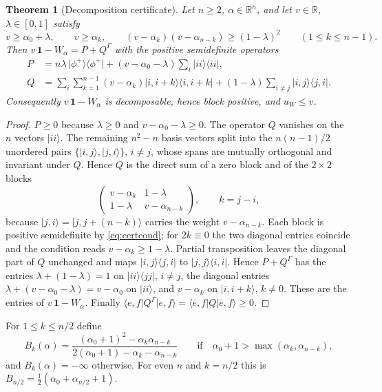 \documentclass[11pt,a4paper]{article}
\newtheorem{theorem}{Theorem}
\theoremstyle{remark}
\newcommand{\ket}[1]{\lvert #1\rangle}
\newcommand{\bra}[1]{\langle #1\rvert}
\newcommand{\ketbra}[2]{\lvert #1\rangle\langle #2\rvert}
\newcommand{\id}{\mathbf{1}}
\newcommand{\G}{\Gamma}
\newcommand{\uW}{u_W}
\begin{document}
\begin{theorem}[Decomposition certificate]\label{thm:cert}
Let $n\ge2$, $\alpha\in\mathbb{R}^n$, and let $v\in\mathbb{R}$, $\lambda\in[0,1]$ satisfy
\begin{equation}\label{eq:certcond}
v\ge\alpha_0+\lambda,\qquad v\ge\alpha_k,\qquad
(v-\alpha_k)(v-\alpha_{n-k})\ge(1-\lambda)^{2}\qquad(1\le k\le n-1).
\end{equation}
Then $v\,\id-W_\alpha=P+Q^{\G}$ with the positive semidefinite operators
\begin{align}
P&=n\lambda\,\ketbra{\phi^+}{\phi^+}+(v-\alpha_0-\lambda)\sum_i\ketbra{ii}{ii},\label{eq:P}\\
Q&=\sum_i\sum_{k=1}^{n-1}(v-\alpha_k)\ketbra{i,i+k}{i,i+k}
+(1-\lambda)\sum_{i\neq j}\ketbra{i,j}{j,i}.\label{eq:Q}
\end{align}
Consequently $v\,\id-W_\alpha$ is decomposable, hence block positive, and $\uW\le v$.
\end{theorem}

\begin{proof}
$P\ge0$ because $\lambda\ge0$ and $v-\alpha_0-\lambda\ge0$. The operator $Q$ vanishes on
the $n$ vectors $\ket{ii}$. The remaining $n^2-n$ basis vectors split into the
$n(n-1)/2$ unordered pairs $\{\ket{i,j},\ket{j,i}\}$, $i\neq j$, whose spans are mutually
orthogonal and invariant under $Q$. Hence $Q$ is the direct sum of a zero block and of
the $2\times2$ blocks
\begin{equation}\label{eq:block}
\begin{pmatrix}v-\alpha_k&1-\lambda\\[1pt]1-\lambda&v-\alpha_{n-k}\end{pmatrix},
\qquad k=j-i,
\end{equation}
because $\ket{j,i}=\ket{j,j+(n-k)}$ carries the weight $v-\alpha_{n-k}$. Each block is
positive semidefinite by \eqref{eq:certcond}; for $2k\equiv0$ the two diagonal entries
coincide and the condition reads $v-\alpha_k\ge1-\lambda$. Partial transposition leaves
the diagonal part of $Q$ unchanged and maps $\ketbra{i,j}{j,i}$ to $\ketbra{j,j}{i,i}$.
Hence $P+Q^{\G}$ has the entries $\lambda+(1-\lambda)=1$ on $\ketbra{ii}{jj}$,
$i\neq j$, the diagonal entries $\lambda+(v-\alpha_0-\lambda)=v-\alpha_0$ on $\ket{ii}$,
and $v-\alpha_k$ on $\ket{i,i+k}$, $k\neq0$. These are the entries of $v\,\id-W_\alpha$.
Finally $\bra{e,f}Q^{\G}\ket{e,f}=\bra{\bar e,f}Q\ket{\bar e,f}\ge0$.
\end{proof}

For $1\le k\le n/2$ define
\begin{equation}\label{eq:Bk}
B_k(\alpha)=\frac{(\alpha_0+1)^{2}-\alpha_k\alpha_{n-k}}{2(\alpha_0+1)-\alpha_k-\alpha_{n-k}}
\qquad\text{if}\quad \alpha_0+1>\max(\alpha_k,\alpha_{n-k}),
\end{equation}
and $B_k(\alpha)=-\infty$ otherwise. For even $n$ and $k=n/2$ this is
$B_{n/2}=\tfrac12(\alpha_0+\alpha_{n/2}+1)$.
\end{document}

